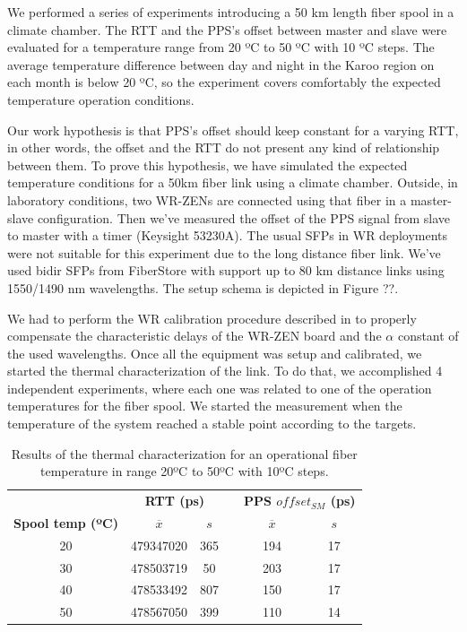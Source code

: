 We performed a series of experiments introducing a 50 km length fiber spool in 
a climate chamber. The RTT and the PPS's offset between master and slave were 
evaluated for a temperature range from 20 ºC to 50 ºC with 10 ºC steps. The 
average temperature difference between day and night in the Karoo region on 
each month is below 20 ºC, so the experiment covers comfortably the expected 
temperature operation conditions.

Our work hypothesis is that PPS's offset should keep constant for a varying 
RTT, in other words, the offset and the RTT do not present any kind of 
relationship between them. To prove this hypothesis, we have simulated the 
expected temperature conditions for a 50km fiber link using a climate chamber. 
Outside, in laboratory conditions, two WR-ZENs are connected using that fiber 
in a master-slave configuration. Then we've measured the offset of the PPS 
signal from slave to master with a timer (Keysight 53230A). The usual SFPs in 
WR deployments were not suitable for this experiment due to the long distance 
fiber link. We've used bidir SFPs from FiberStore with support up to 80 km 
distance links using 1550/1490 nm wavelengths. The setup schema is depicted in 
Figure ??. 

We had to perform the WR calibration procedure described in \cite{man:calib} to 
properly compensate the characteristic delays of the WR-ZEN board and the 
$\alpha$ constant of the used wavelengths. Once all the equipment was setup and 
calibrated, we started the thermal characterization of the link. To do that, we 
accomplished 4 independent experiments, where each one was related to one of 
the operation temperatures for the fiber spool. We started the measurement when 
the temperature of the system reached a stable point according to the targets. 

\begin{table}\centering
	\begin{tabular}{@{} cccccc@{}}%
		& \multicolumn{2}{c}{\bfseries{RTT (ps)}} & &
		\multicolumn{2}{c}{\bfseries{PPS $offset_{SM}$ (ps)}} \\
		\cmidrule(l){2-3}  \cmidrule{5-6}
		\textbf{Spool temp (ºC)} & $\overline{x}$ & $s$ & & $\overline{x}$ 
		& $s$ \\ \midrule
	\small{20} & 479347020 & 365 & & 194 & 17 \\
	\small{30} & 478503719 & 50  & & 203 & 17 \\
	\small{40} & 478533492 & 807 & & 150 & 17 \\
	\small{50} & 478567050 & 399 & & 110 & 14 \\
	\bottomrule
	\end{tabular}
	\caption{Results of the thermal characterization for an operational fiber 
		temperature in range 20ºC to 50ºC with 10ºC steps.}
	\label{tab:temp}
\end{table}

